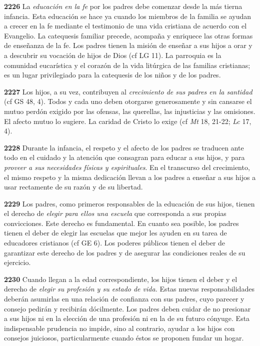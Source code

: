 \documentclass[]{article}
\begin{document}
\textbf{2226} La \emph{educación en la fe} por los padres debe comenzar
desde la más tierna infancia. Esta educación se hace ya cuando los
miembros de la familia se ayudan a crecer en la fe mediante el
testimonio de una vida cristiana de acuerdo con el Evangelio. La
catequesis familiar precede, acompaña y enriquece las otras formas de
enseñanza de la fe. Los padres tienen la misión de enseñar a sus hijos a
orar y a descubrir su vocación de hijos de Dios (cf LG 11). La parroquia
es la comunidad eucarística y el corazón de la vida litúrgica de las
familias cristianas; es un lugar privilegiado para la catequesis de los
niños y de los padres.

\textbf{2227} Los hijos, a su vez, contribuyen al \emph{crecimiento de
sus padres en la santidad} (cf GS 48, 4). Todos y cada uno deben
otorgarse generosamente y sin cansarse el mutuo perdón exigido por las
ofensas, las querellas, las injusticias y las omisiones. El afecto mutuo
lo sugiere. La caridad de Cristo lo exige (cf \emph{Mt} 18, 21-22;
\emph{Lc} 17, 4).

\textbf{2228} Durante la infancia, el respeto y el afecto de los padres
se traducen ante todo en el cuidado y la atención que consagran para
educar a sus hijos, y para \emph{proveer a sus necesidades físicas y
espirituales}. En el transcurso del crecimiento, el mismo respeto y la
misma dedicación llevan a los padres a enseñar a sus hijos a usar
rectamente de su razón y de su libertad.

\textbf{2229} Los padres, como primeros responsables de la educación de
sus hijos, tienen el derecho de \emph{elegir para ellos una escuela} que
corresponda a sus propias convicciones. Este derecho es fundamental. En
cuanto sea posible, los padres tienen el deber de elegir las escuelas
que mejor les ayuden en su tarea de educadores cristianos (cf GE 6). Los
poderes públicos tienen el deber de garantizar este derecho de los
padres y de asegurar las condiciones reales de su ejercicio.

\textbf{2230} Cuando llegan a la edad correspondiente, los hijos tienen
el deber y el derecho de \emph{elegir su profesión y su estado de vida.}
Estas nuevas responsabilidades deberán asumirlas en una relación de
confianza con sus padres, cuyo parecer y consejo pedirán y recibirán
dócilmente. Los padres deben cuidar de no presionar a sus hijos ni en la
elección de una profesión ni en la de su futuro cónyuge. Esta
indispensable prudencia no impide, sino al contrario, ayudar a los hijos
con consejos juiciosos, particularmente cuando éstos se proponen fundar
un hogar.
\end{document}
